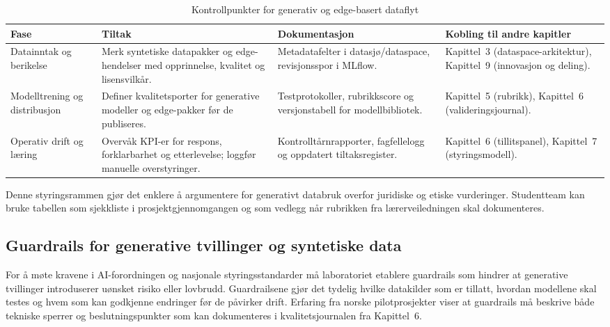 \begin{table}[htbp]
    \centering
    \caption{Kontrollpunkter for generativ og edge-basert dataflyt}
    \label{tab:kontrollpunkter-generativ}
    \begin{tabular}{p{3.6cm}p{4.0cm}p{4.2cm}p{3.8cm}}
        \toprule
        \textbf{Fase} & \textbf{Tiltak} & \textbf{Dokumentasjon} & \textbf{Kobling til andre kapitler} \\
        \midrule
        Datainntak og berikelse & Merk syntetiske datapakker og edge-hendelser med opprinnelse, kvalitet og lisensvilkår. & Metadatafelter i datasjø/dataspace, revisjonsspor i MLflow. & Kapittel~3 (dataspace-arkitektur), Kapittel~9 (innovasjon og deling). \\
        \addlinespace
        Modelltrening og distribusjon & Definer kvalitetsporter for generative modeller og edge-pakker før de publiseres. & Testprotokoller, rubrikkscore og versjonstabell for modellbibliotek. & Kapittel~5 (rubrikk), Kapittel~6 (valideringsjournal). \\
        \addlinespace
        Operativ drift og læring & Overvåk KPI-er for respons, forklarbarhet og etterlevelse; loggfør manuelle overstyringer. & Kontrolltårnrapporter, fagfellelogg og oppdatert tiltaksregister. & Kapittel~6 (tillitspanel), Kapittel~7 (styringsmodell). \\
        \bottomrule
    \end{tabular}
\end{table}

Denne styringsrammen gjør det enklere å argumentere for generativt databruk overfor juridiske og etiske vurderinger. Studentteam kan bruke tabellen som sjekkliste i prosjektgjennomgangen og som vedlegg når rubrikken fra lærerveiledningen skal dokumenteres.

\subsection{Guardrails for generative tvillinger og syntetiske data}
For å møte kravene i AI-forordningen og nasjonale styringsstandarder må laboratoriet etablere guardrails som hindrer at generative tvillinger introduserer uønsket risiko eller lovbrudd.\citep{eu2024aiact,dfo2024internkontroll} Guardrailsene gjør det tydelig hvilke datakilder som er tillatt, hvordan modellene skal testes og hvem som kan godkjenne endringer før de påvirker drift. Erfaring fra norske pilotprosjekter viser at guardrails må beskrive både tekniske sperrer og beslutningspunkter som kan dokumenteres i kvalitetsjournalen fra Kapittel~6.

